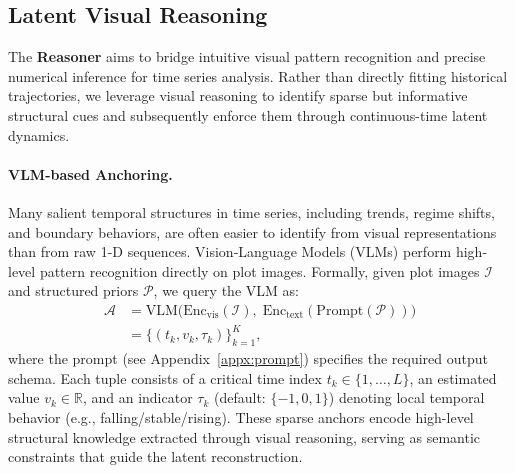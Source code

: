 \subsection{Latent Visual Reasoning}
\label{subsec:visual_reasoning}
The \textbf{Reasoner} aims to bridge intuitive visual pattern recognition and precise numerical inference for time series analysis.
Rather than directly fitting historical trajectories, we leverage visual reasoning to identify sparse but informative structural cues and subsequently enforce them through continuous-time latent dynamics.

\paragraph{VLM-based Anchoring.}
Many salient temporal structures in time series, including trends, regime shifts, and boundary behaviors, are often easier to identify from visual representations than from raw 1-D sequences.
Vision-Language Models (VLMs) perform high-level pattern recognition directly on plot images.
Formally, given plot images $\mathcal{I}$ and structured priors $\mathcal{P}$, we query the VLM as:
\begin{align}
\mathcal{A} &= \text{VLM}\Big(
\text{Enc}_{\text{vis}}(\mathcal{I}),\;
\text{Enc}_{\text{text}}(\text{Prompt}(\mathcal{P}))
\Big) \\ &= \{(t_k, v_k, \tau_k)\}_{k=1}^{K},
\end{align}
where the prompt (see Appendix~\ref{appx:prompt}) specifies the required output schema.
Each tuple consists of a critical time index $t_k \in \{1,\dots,L\}$, an estimated value $v_k \in \mathbb{R}$, and an indicator $\tau_k$ (default: $\{-1,0,1\}$) denoting local temporal behavior (e.g., falling/stable/rising).
These sparse anchors encode high-level structural knowledge extracted through visual reasoning, serving as semantic constraints that guide the latent reconstruction.

